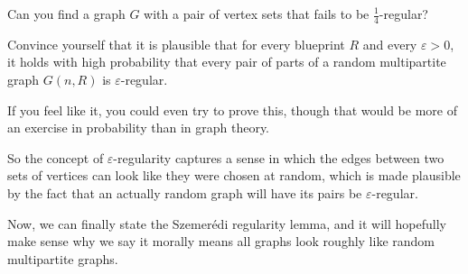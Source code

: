 \documentclass[nobib]{tufte-handout}
\begin{document}
\begin{xca}
  Can you find a graph $G$ with a pair of vertex sets that fails to be $\frac{1}{4}$-regular?
\end{xca}

\begin{xca}
  Convince yourself that it is plausible that for every blueprint $R$ and every $\varepsilon > 0$, it holds with high probability that every pair of parts of a random multipartite graph $G(n,R)$ is $\varepsilon$-regular.
  
  If you feel like it, you could even try to prove this, though that would be more of an exercise in probability than in graph theory.
\end{xca}

So the concept of $\varepsilon$-regularity captures a sense in which the edges between two sets of vertices can look like they were chosen at random, which is made plausible by the fact that an actually random graph will have its pairs be $\varepsilon$-regular.

Now, we can finally state the Szemerédi regularity lemma, and it will hopefully make sense why we say it morally means all graphs look roughly like random multipartite graphs.
\end{document}
